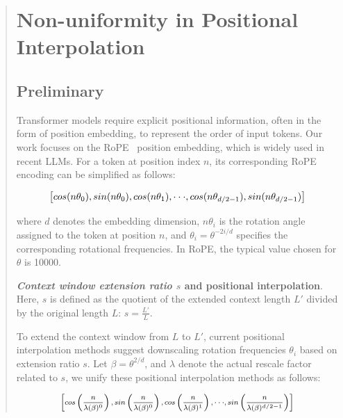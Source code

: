 \begin{abstract}
\section{Non-uniformity in Positional Interpolation}
\label{sec:analysis}

\subsection{Preliminary}

Transformer models require explicit positional information, often in the form of position embedding, to represent the order of input tokens. Our work focuses on the RoPE~\cite{rope} position embedding, which is widely used in recent  LLMs. For a token at position index $n$, its corresponding RoPE encoding can be simplified as follows:

\begin{equation}
		\fontsize{7.8}{7.8} \selectfont
	\label{eq:rope}
	\left[ cos(n\theta_0), sin(n\theta_0), cos(n\theta_1), \cdot\cdot\cdot, cos(n\theta_{d/2-1}), sin(n\theta_{d/2-1}) \right]   
\end{equation}

where $d$ denotes the embedding dimension, $n\theta_i$ is the rotation angle assigned to the token at position $n$, and $\theta_i=\theta^{-2i/d}$ specifies the corresponding rotational frequencies. In RoPE, the typical value chosen for $\theta$ is 10000.

\textbf{\emph{Context window extension ratio $s$} and positional interpolation}. Here, $s$ is defined as the quotient of the extended context length $L'$ divided by the original length $L$: $s=\frac{L'}{L}$.

To extend the context window from $L$ to $L'$, current positional interpolation methods suggest downscaling rotation frequencies $\theta_i$ based on extension ratio $s$. Let $\beta=\theta^{2/d}$, and $\lambda$ denote the actual rescale factor related to $s$, we   unify these positional interpolation methods as follows:

\begin{equation}	
	\fontsize{7.5}{7.5} \selectfont
	\label{eq:unified_rope}
	\begin{aligned}
		\left[cos\left(\frac{n}{\lambda(\beta)^0}\right), sin \left(\frac{n}{\lambda(\beta)^0}\right), cos\left(\frac{n}{\lambda(\beta)^1}\right), \cdot\cdot\cdot,  sin \left(\frac{n}{\lambda(\beta)^{d/2-1}}\right) \right]   
	\end{aligned}
\end{equation}


\end{abstract}
